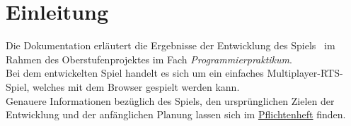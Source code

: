 \section{Einleitung}
Die Dokumentation erläutert die Ergebnisse der Entwicklung des Spiels \vires\ im Rahmen des Oberstufenprojektes im Fach \textit{Programmierpraktikum}. \\
Bei dem entwickelten Spiel handelt es sich um ein einfaches Multiplayer-RTS-Spiel, welches mit dem Browser gespielt werden kann. \\
Genauere Informationen bezüglich des Spiels, den ursprünglichen Zielen der Entwicklung und der anfänglichen Planung lassen sich im \href{https://github.com/mhuisi/vires/blob/master/doc/fsd/vires.pdf}{Pflichtenheft} finden.